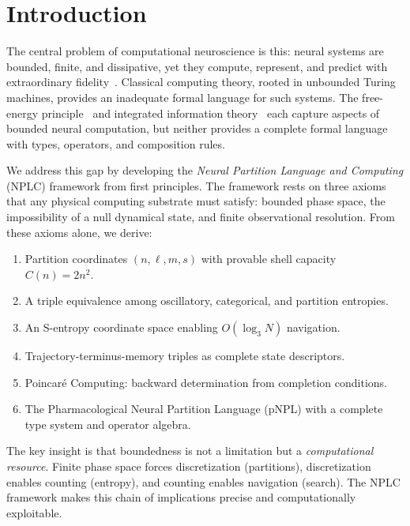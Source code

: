 \documentclass[10pt,twocolumn]{article}
\theoremstyle{remark}
\begin{document}
\section{Introduction}
\label{sec:introduction}

The central problem of computational neuroscience is this: neural systems are bounded, finite, and dissipative, yet they compute, represent, and predict with extraordinary fidelity~\cite{buzsaki2006rhythms,fries2005mechanism}. Classical computing theory, rooted in unbounded Turing machines, provides an inadequate formal language for such systems. The free-energy principle~\cite{friston2010free} and integrated information theory~\cite{tononi2016integrated} each capture aspects of bounded neural computation, but neither provides a complete formal language with types, operators, and composition rules.

We address this gap by developing the \emph{Neural Partition Language and Computing} (NPLC) framework from first principles. The framework rests on three axioms that any physical computing substrate must satisfy: bounded phase space, the impossibility of a null dynamical state, and finite observational resolution. From these axioms alone, we derive:

\begin{enumerate}[noitemsep]
\item Partition coordinates $(n, \ell, m, s)$ with provable shell capacity $C(n) = 2n^2$.
\item A triple equivalence among oscillatory, categorical, and partition entropies.
\item An S-entropy coordinate space enabling $O(\log_3 N)$ navigation.
\item Trajectory-terminus-memory triples as complete state descriptors.
\item Poincar\'{e} Computing: backward determination from completion conditions.
\item The Pharmacological Neural Partition Language (pNPL) with a complete type system and operator algebra.
\end{enumerate}

The key insight is that boundedness is not a limitation but a \emph{computational resource}. Finite phase space forces discretization (partitions), discretization enables counting (entropy), and counting enables navigation (search). The NPLC framework makes this chain of implications precise and computationally exploitable.
\end{document}
